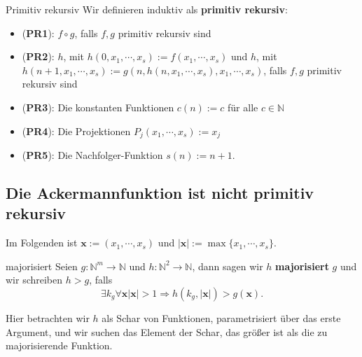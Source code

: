 \documentclass[a4paper]{amsart}
\theoremstyle{definition}
\newcommand{\N}{\ensuremath{\mathbb{ N }}}
\newcommand{\bb}[1]{\mathbf{#1}}
\begin{document}
\begin{Definition}{Primitiv rekursiv}
    Wir definieren induktiv als \textbf{primitiv rekursiv}:
    
    \begin{itemize}
        \item (\textbf{PR1}): $f \circ g$, falls $f,g$ primitiv rekursiv sind
        \item (\textbf{PR2}): $h$, mit $h( 0, x_1, \cdots, x_s ) := f( x_1, \cdots, x_s )$ und
            $h$, mit $h( n+1, x_1, \cdots, x_s ) := g(n, h( n, x_1, \cdots, x_s ), x_1, \cdots, x_s)$,
             falls $f,g$ primitiv rekursiv sind 
        \item (\textbf{PR3}): Die konstanten Funktionen $c(n) := c$ für alle $c \in \N$ 
        \item (\textbf{PR4}): Die Projektionen $P_j(x_1, \cdots, x_s ) := x_j$
        \item (\textbf{PR5}): Die Nachfolger-Funktion $s(n) := n+1$.
    \end{itemize}
\end{Definition}

\subsection{Die Ackermannfunktion ist nicht primitiv rekursiv}
Im Folgenden ist $\bb{x} := (x_1, \cdots, x_s)$ und $|\bb{x}| := \max \{x_1, \cdots, x_s \}$.

\begin{Definition}{majorisiert}
    Seien $g \colon \N^m \to \N$ und $h \colon \N^2 \to \N$, dann sagen wir $h$ \textbf{majorisiert} $g$
    und wir schreiben $h > g$,
    falls
    \begin{equation*}
        \exists k_g \forall \bb{x} |\bb{x}| > 1 \Rightarrow h( k_g,  |\bb{x}| ) > g(  \bb{x} ).
    \end{equation*}
   
\end{Definition}
Hier betrachten wir $h$ als Schar von Funktionen, parametrisiert über das erste Argument, und wir suchen
das Element der Schar, das größer ist als die zu majorisierende Funktion.
\end{document}
